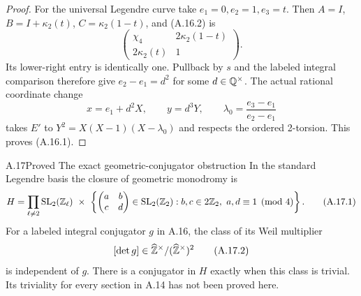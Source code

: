 \begin{proof}
For the universal Legendre curve take $e_1=0,e_2=1,e_3=t$.
Then $A=I$, $B=I+\kappa_2(t)$, $C=\kappa_2(1-t)$, and (A.16.2) is
\[
       \begin{pmatrix}\chi_4&2\kappa_2(1-t)\\
                       2\kappa_2(t)&1\end{pmatrix}.
\tag{A.16.3}
\]
Its lower-right entry is identically one.  Pullback by $s$ and the
labeled integral comparison therefore give $e_2-e_1=d^2$ for some
$d\in\mathbb Q^\times$.  The actual rational coordinate change
\[
 x=e_1+d^2X,\qquad y=d^3Y,
 \qquad \lambda_0=\frac{e_3-e_1}{e_2-e_1}
\]
takes $E'$ to $Y^2=X(X-1)(X-\lambda_0)$ and respects the ordered
2-torsion.  This proves (A.16.1).
\end{proof}

\begin{statement}{A.17}{Proved}
{The exact geometric-conjugator obstruction}
In the standard Legendre basis the closure of geometric monodromy is
\[
 H=\prod_{\ell\ne2}\operatorname{SL}_2(\Z_\ell)\ \times\
 \left\{\begin{pmatrix}a&b\\c&d\end{pmatrix}\in
 \operatorname{SL}_2(\Z_2): b,c\in2\Z_2,
                     \ a,d\equiv1\pmod4\right\}.
\tag{A.17.1}
\]
For a labeled integral conjugator $g$ in A.16, the class of its Weil
multiplier
\[
                 [\det g]\in
           \widehat{\mathbb Z}^\times/(\widehat{\mathbb Z}^\times)^2
\tag{A.17.2}
\]
is independent of $g$.  There is a conjugator in $H$ exactly when this
class is trivial.  Its triviality for every section in A.14 has not
been proved here.
\end{statement}
